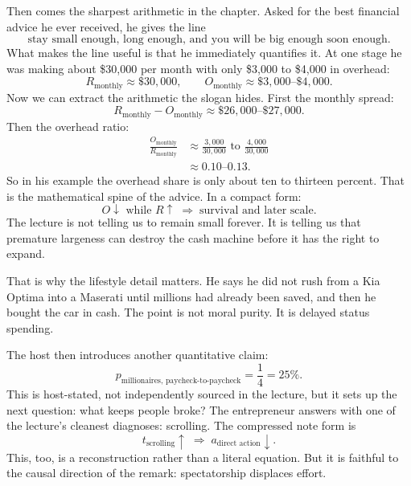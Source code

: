 Then comes the sharpest arithmetic in the chapter. Asked for the best financial advice he ever received, he gives the line
\[
\text{stay small enough, long enough, and you will be big enough soon enough.}
\]
What makes the line useful is that he immediately quantifies it. At one stage he was making about \$30{,}000 per month with only \$3{,}000 to \$4{,}000 in overhead:
\begin{equation}
R_{\text{monthly}} \approx \$30{,}000,\qquad
O_{\text{monthly}} \approx \$3{,}000\text{--}\$4{,}000.
\end{equation}
Now we can extract the arithmetic the slogan hides. First the monthly spread:
\begin{equation}
R_{\text{monthly}} - O_{\text{monthly}}
\approx \$26{,}000\text{--}\$27{,}000.
\end{equation}
Then the overhead ratio:
\begin{align}
\frac{O_{\text{monthly}}}{R_{\text{monthly}}}
&\approx \frac{3{,}000}{30{,}000}\text{ to }\frac{4{,}000}{30{,}000}\\
&\approx 0.10\text{--}0.13.
\end{align}
So in his example the overhead share is only about ten to thirteen percent. That is the mathematical spine of the advice. In a compact form:
\begin{equation}
O \downarrow \text{ while } R \uparrow
\;\Rightarrow\;
\text{survival and later scale}.
\end{equation}
The lecture is not telling us to remain small forever. It is telling us that premature largeness can destroy the cash machine before it has the right to expand.

That is why the lifestyle detail matters. He says he did not rush from a Kia Optima into a Maserati until millions had already been saved, and then he bought the car in cash. The point is not moral purity. It is delayed status spending.

The host then introduces another quantitative claim:
\begin{equation}
p_{\text{millionaires, paycheck-to-paycheck}} = \frac{1}{4}=25\%.
\end{equation}
This is host-stated, not independently sourced in the lecture, but it sets up the next question: what keeps people broke? The entrepreneur answers with one of the lecture's cleanest diagnoses: scrolling. The compressed note form is
\begin{equation}
t_{\text{scrolling}}\uparrow \;\Rightarrow\; a_{\text{direct action}}\downarrow.
\end{equation}
This, too, is a reconstruction rather than a literal equation. But it is faithful to the causal direction of the remark: spectatorship displaces effort.

